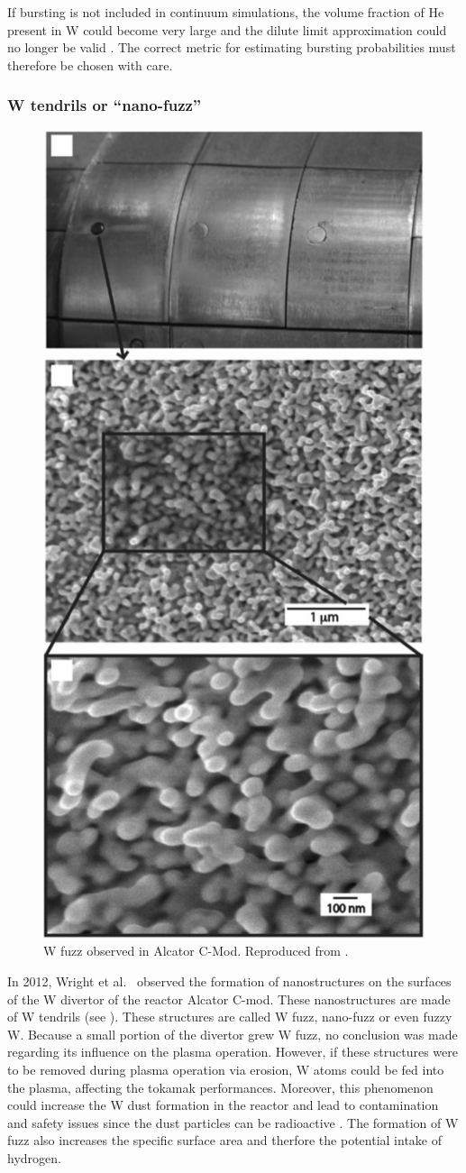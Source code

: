 If \gls{bursting} is not included in continuum simulations, the volume fraction of \gls{He} present in \gls{W} could become very large and the dilute limit approximation could no longer be valid .
The correct metric for estimating \gls{bursting} probabilities must therefore be chosen with care.

\subsubsection{W tendrils or ``nano-fuzz''}

\begin{figure} [h!]
    \centering
    \includegraphics[width=0.5\linewidth]{Figures/Chapter1/fuzz_alcator_wright.jpg}
    \caption{W fuzz observed in Alcator C-Mod. Reproduced from \cite{wright_tungsten_2012}.}
\end{figure}

In 2012, Wright et al.\  observed the formation of nanostructures on the surfaces of the \gls{W} divertor of the reactor Alcator C-mod.
These nanostructures are made of \gls{W} \glspl{tendril} (see ).
These structures are called \gls{W} \gls{fuzz}, nano-fuzz or even fuzzy \gls{W}.
Because a small portion of the \gls{divertor} grew \gls{W} \gls{fuzz}, no conclusion was made regarding its influence on the \gls{plasma} operation.
However, if these structures were to be removed during \gls{plasma} operation via erosion, \gls{W} atoms could be fed into the \gls{plasma}, affecting the \gls{tokamak} performances.
Moreover, this phenomenon could increase the \gls{W} dust formation in the reactor and lead to contamination and safety issues since the dust particles can be radioactive .
The formation of \gls{W} \gls{fuzz} also increases the specific surface area and therfore the potential intake of hydrogen.

